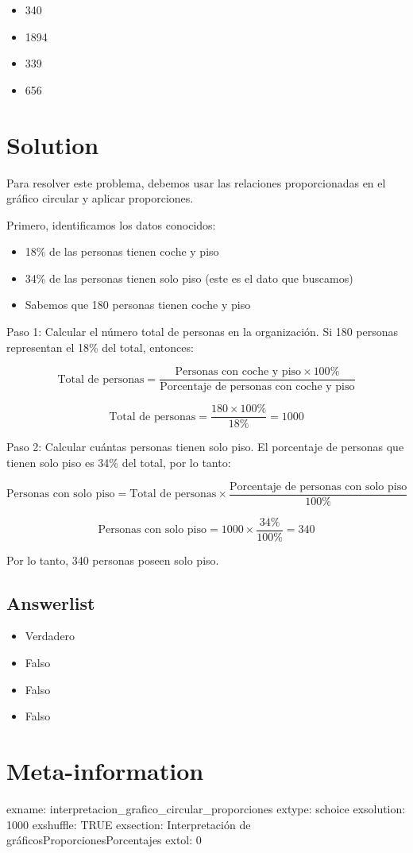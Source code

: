 \documentclass[
]{article}
\providecommand{\tightlist}{%
  \setlength{\itemsep}{0pt}\setlength{\parskip}{0pt}}
\begin{document}
\begin{itemize}
\tightlist
\item
  340
\item
  1894
\item
  339
\item
  656
\end{itemize}

\section{Solution}\label{solution}

Para resolver este problema, debemos usar las relaciones proporcionadas
en el gráfico circular y aplicar proporciones.

Primero, identificamos los datos conocidos:

\begin{itemize}
\tightlist
\item
  18\% de las personas tienen coche y piso
\item
  34\% de las personas tienen solo piso (este es el dato que buscamos)
\item
  Sabemos que 180 personas tienen coche y piso
\end{itemize}

Paso 1: Calcular el número total de personas en la organización. Si 180
personas representan el 18\% del total, entonces:

\[\text{Total de personas} = \frac{\text{Personas con coche y piso} \times 100\%}{\text{Porcentaje de personas con coche y piso}}\]

\[\text{Total de personas} = \frac{180 \times 100\%}{18\%} = 1000\]

Paso 2: Calcular cuántas personas tienen solo piso. El porcentaje de
personas que tienen solo piso es 34\% del total, por lo tanto:

\[\text{Personas con solo piso} = \text{Total de personas} \times \frac{\text{Porcentaje de personas con solo piso}}{100\%}\]

\[\text{Personas con solo piso} = 1000 \times \frac{34\%}{100\%} = 340\]

Por lo tanto, 340 personas poseen solo piso.

\subsection{Answerlist}\label{answerlist-1}

\begin{itemize}
\tightlist
\item
  Verdadero
\item
  Falso
\item
  Falso
\item
  Falso
\end{itemize}

\section{Meta-information}\label{meta-information}

exname: interpretacion\_grafico\_circular\_proporciones extype: schoice
exsolution: 1000 exshuffle: TRUE exsection: Interpretación de
gráficos\textbar Proporciones\textbar Porcentajes extol: 0
\end{document}
